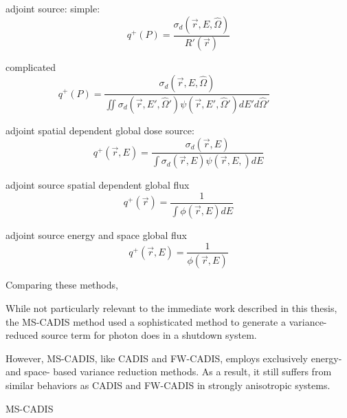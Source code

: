 adjoint source:
simple:
\begin{equation}
{ q^+ } (P)=\frac{\sigma_d(\vec{r},E,\hat\Omega)}{R'(\vec{r})}
\end{equation}
\label{eq:adjointsourcesimple}

complicated
\begin{equation}
{ q^{ + } }(P)=\frac { \sigma _{ d }(\vec { r } ,E,\hat { \Omega  } ) }{ \iint { \sigma _{ d }(\vec { r } ,E',\hat { \Omega  } ')\psi (\vec { r } ,E',\hat { \Omega  } ') } dE'd\hat { \Omega  } ' } \quad \quad \quad 
\end{equation}
\label{eq:adjointsourcecomplicated}

adjoint spatial dependent global dose source:
\begin{equation}
{ q^{ + } }(\vec { r } ,E)=\frac { \sigma _{ d }(\vec { r } ,E) }{ \int { \sigma _{ d }(\vec { r } ,E)\psi (\vec { r } ,E,) } dE }
\end{equation}
\label{eq:FWCadglobaldose}

adjoint source spatial dependent global flux
\begin{equation}
{ q^{ + } }(\vec { r })=\frac { 1 }{ \int { \phi (\vec { r } ,E) } dE }
\end{equation}
\label{eq:FWCadglobalflux}

adjoint source energy and space global flux
\begin{equation}
{ q^{ + } }(\vec { r } ,E)=\frac { 1 }{\phi (\vec { r } ,E) }
\end{equation}
\label{eq:FWCadglobalflux2}

Comparing these methods, \cite{peplow_comparison_2012} 

%
%
While not particularly relevant to the immediate work described in this thesis, the MS-CADIS method used a sophisticated method to generate a variance-reduced source term for 
photon does in a shutdown system. 

However, MS-CADIS, like CADIS and FW-CADIS, employs exclusively energy- and space- based variance reduction methods. As a result, it still suffers from similar behaviors as CADIS and FW-CADIS in strongly anisotropic systems. 

MS-CADIS \cite{ibrahim_multi-step_2014, ibrahim_analysis_2014}
